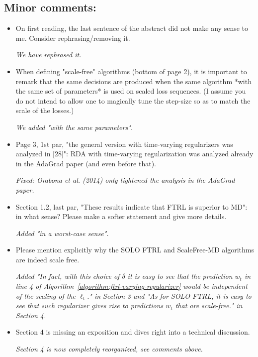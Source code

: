 \documentclass{article}
\begin{document}
\subsection{Minor comments:}
\begin{itemize}
\item On first reading, the last sentence of the abstract did not make any sense to me. Consider rephrasing/removing it.

\emph{We have rephrased it.}

\item When defining "scale-free" algorithms (bottom of page 2), it is important to remark that the same decisions are produced when the same algorithm *with the same set of parameters* is used on scaled loss sequences. (I assume you do not intend to allow one to magically tune the step-size so as to match the scale of the losses.)

\emph{We added "with the same parameters".}

\item Page 3, 1st par, "the general version with time-varying regularizers was analyzed in [28]": RDA with time-varying regularization was analyzed already in the AdaGrad paper (and even before that).

\emph{Fixed: Orabona et al. (2014) only tightened the analysis in the AdaGrad paper.}

\item Section 1.2, last par, "These results indicate that FTRL is superior to MD": in what sense? Please make a softer statement and give more details.

\emph{Added "in a worst-case sense".}

\item Please mention explicitly why the SOLO FTRL and ScaleFree-MD algorithms are indeed scale free.

\emph{Added "In fact, with this choice of $\delta$ it is easy to see that the prediction $w_t$ in line 4 of Algorithm~\ref{algorithm:ftrl-varying-regularizer} would be independent of the scaling of the $\ell_t$." in Section 3 and "As for \textsc{SOLO FTRL}, it is easy to see that such regularizer gives rise to predictions $w_t$ that are scale-free." in Section 4.}

\item Section 4 is missing an exposition and dives right into a technical discussion.

\emph{Section 4 is now completely reorganized, see comments above.}


\end{itemize}
\end{document}

